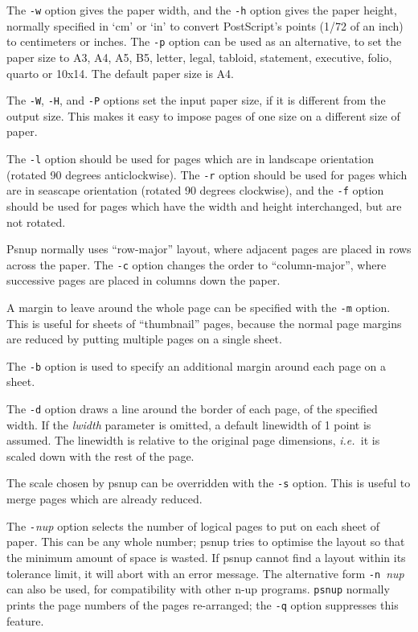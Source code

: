 \documentclass[twoside,11pt]{article}
\begin{document}
\begin{itemize}
The {\tt -w} option gives the paper width, and the {\tt -h} option gives the paper height, normally specified in `cm' or `in' to convert PostScript's points
(1/72 of an inch) to centimeters or inches. The {\tt -p} option can be used as an alternative, to set the paper size to A3, A4, A5, B5, letter, legal, tabloid,
statement, executive, folio, quarto or 10x14. The default paper size is A4. 

The {\tt -W}, {\tt -H}, and {\tt -P} options set the input paper size, if it is different from the output size. This makes it easy to impose pages of one size on a different size of paper. 

The {\tt -l} option should be used for pages which are in landscape orientation (rotated 90 degrees anticlockwise). The {\tt -r} option should be used for
pages which are in seascape orientation (rotated 90 degrees clockwise), and the {\tt -f} option should be used for pages which have the width and height interchanged, but are not rotated. 

Psnup normally uses ``row-major'' layout, where adjacent pages are placed in rows across the paper. The {\tt -c} option changes the order to ``column-major'', where successive pages are placed in columns down the paper. 

A margin to leave around the whole page can be specified with the {\tt -m} option. This is useful for sheets of ``thumbnail'' pages, because the normal page margins are reduced by putting multiple pages on a single sheet. 

The {\tt -b} option is used to specify an additional margin around each page on a sheet. 

The {\tt -d} option draws a line around the border of each page, of the specified width. If the {\em lwidth} parameter is omitted, a default linewidth of 1 point is assumed. The linewidth is relative to the original page dimensions, {\em i.e.\ }it is scaled down with the rest of the page. 

The scale chosen by psnup can be overridden with the {\tt -s} option. This is useful to merge pages which are already reduced. 

The {\tt -}{\em nup} option selects the number of logical pages to put on each sheet of paper. This can be any whole number; psnup tries to optimise the
layout so that the minimum amount of space is wasted. If psnup cannot find a layout within its tolerance limit, it will abort with an error message. The
alternative form {\tt -n }{\em nup} can also be used, for compatibility with other n-up programs. {\tt psnup} normally prints the page numbers of the pages re-arranged; the {\tt -q} option suppresses this feature. 


\end{itemize}
\end{document}
